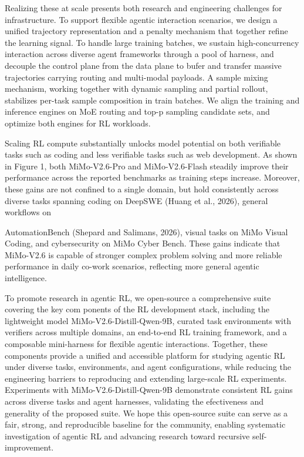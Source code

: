 \documentclass[
  10
]{article}
\begin{document}
Realizing these at scale presents both research and engineering
challenges for infrastructure. To support flexible agentic interaction
scenarios, we design a unified trajectory representation and a penalty
mechanism that together refine the learning signal. To handle large
training batches, we sustain high-concurrency interaction across diverse
agent frameworks through a pool of harness, and decouple the control
plane from the data plane to bufer and transfer massive trajectories
carrying routing and multi-modal payloads. A sample mixing mechanism,
working together with dynamic sampling and partial rollout, stabilizes
per-task sample composition in train batches. We align the training and
inference engines on MoE routing and top-p sampling candidate sets, and
optimize both engines for RL workloads.

Scaling RL compute substantially unlocks model potential on both
verifiable tasks such as coding and less verifiable tasks such as web
development. As shown in Figure 1, both MiMo-V2.6-Pro and
MiMo-V2.6-Flash steadily improve their performance across the reported
benchmarks as training steps increase. Moreover, these gains are not
confined to a single domain, but hold consistently across diverse tasks
spanning coding on DeepSWE (Huang et al., 2026), general workflows on

AutomationBench (Shepard and Salimans, 2026), visual tasks on MiMo
Visual Coding, and cybersecurity on MiMo Cyber Bench. These gains
indicate that MiMo-V2.6 is capable of stronger complex problem solving
and more reliable performance in daily co-work scenarios, reflecting
more general agentic intelligence.

To promote research in agentic RL, we open-source a comprehensive suite
covering the key com ponents of the RL development stack, including the
lightweight model MiMo-V2.6-Distill-Qwen-9B, curated task environments
with verifiers across multiple domains, an end-to-end RL training
framework, and a composable mini-harness for flexible agentic
interactions. Together, these components provide a unified and
accessible platform for studying agentic RL under diverse tasks,
environments, and agent configurations, while reducing the engineering
barriers to reproducing and extending large-scale RL experiments.
Experiments with MiMo-V2.6-Distill-Qwen-9B demonstrate consistent RL
gains across diverse tasks and agent harnesses, validating the
efectiveness and generality of the proposed suite. We hope this
open-source suite can serve as a fair, strong, and reproducible baseline
for the community, enabling systematic investigation of agentic RL and
advancing research toward recursive self-improvement.
\end{document}
